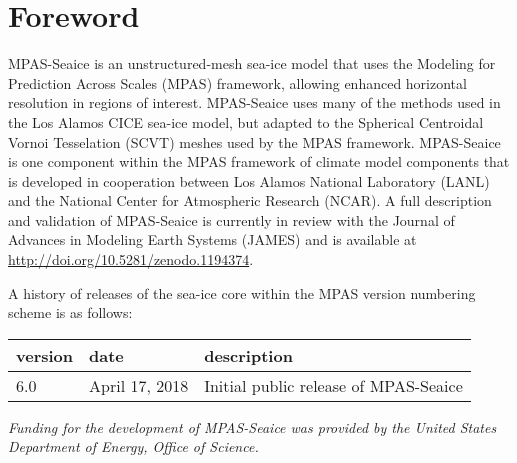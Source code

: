 \chapter*{Foreword}
\label{chap:foreword}

MPAS-Seaice is an unstructured-mesh sea-ice model that uses the
Modeling for Prediction Across Scales (MPAS) framework, allowing
enhanced horizontal resolution in regions of interest. MPAS-Seaice
uses many of the methods used in the Los Alamos CICE sea-ice model,
but adapted to the Spherical Centroidal Vornoi Tesselation (SCVT) meshes used
by the MPAS framework. MPAS-Seaice is one component within the MPAS
framework of climate model components that is developed in cooperation between Los Alamos
National Laboratory (LANL) and the National Center for Atmospheric
Research (NCAR). A full description and validation of MPAS-Seaice is
currently in review with the Journal of Advances in Modeling Earth
Systems (JAMES) and is available at \url{http://doi.org/10.5281/zenodo.1194374}.


A history of releases of the sea-ice core within the MPAS version numbering scheme is as follows:

\begin{table}[H]
\begin{tabular}{lll} 
\hline\hline version & date & description  \\
\hline 
6.0 & April 17, 2018 & Initial public release of MPAS-Seaice \\
\hline 
\end{tabular}
\end{table} 


\vspace{8pt}
\noindent
{\it Funding for the development of MPAS-Seaice was provided by the United States Department of Energy, Office of Science.}

\newpage
